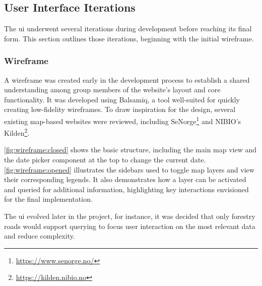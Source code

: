 \subsection{User Interface Iterations} %

The \acrfull{ui} underwent several iterations during development before reaching its final form. This section outlines those iterations, beginning with the initial wireframe.

\subsubsection*{Wireframe}

A wireframe was created early in the development process to establish a shared understanding among group members of the website’s layout and core functionality. It was developed using Balsamiq, a tool well-suited for quickly creating low-fidelity wireframes. To draw inspiration for the design, several existing map-based websites were reviewed, including SeNorge\footnote{\url{https://www.senorge.no/}} and NIBIO's Kilden\footnote{\url{https://kilden.nibio.no}}.

\autoref{fig:wireframe:closed} shows the basic structure, including the main map view and the date picker component at the top to change the current date. \autoref{fig:wireframe:opened} illustrates the sidebars used to toggle map layers and view their corresponding legends. It also demonstrates how a layer can be activated and queried for additional information, highlighting key interactions envisioned for the final implementation.

The \acrshort{ui} evolved later in the project, for instance, it was decided that only forestry roads would support querying to focus user interaction on the most relevant data and reduce complexity.

